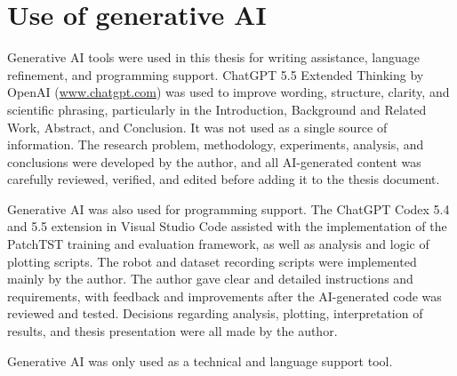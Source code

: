 \chapter*{Use of generative AI}
{}

Generative AI tools were used in this thesis for writing assistance, language refinement, and programming support. ChatGPT 5.5 Extended Thinking by OpenAI (\href{https://www.chatgpt.com}{www.chatgpt.com}) was used to improve wording, structure, clarity, and scientific phrasing, particularly in the Introduction, Background and Related Work, Abstract, and Conclusion. It was not used as a single source of information. The research problem, methodology, experiments, analysis, and conclusions were developed by the author, and all AI-generated content was carefully reviewed, verified, and edited before adding it to the thesis document.

Generative AI was also used for programming support. The ChatGPT Codex 5.4 and 5.5 extension in Visual Studio Code assisted with the implementation of the PatchTST training and evaluation framework, as well as analysis and logic of plotting scripts. The robot and dataset recording scripts were implemented mainly by the author. The author gave clear and detailed instructions and requirements, with feedback and improvements after the AI-generated code was reviewed and tested. Decisions regarding analysis, plotting, interpretation of results, and thesis presentation were all made by the author.

Generative AI was only used as a technical and language support tool.